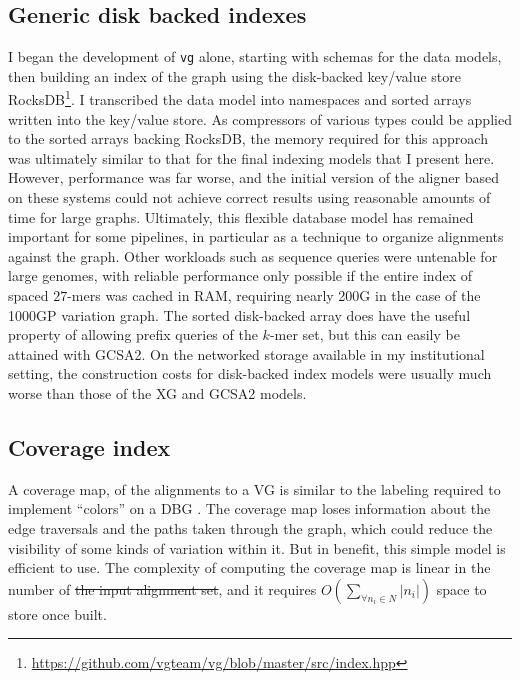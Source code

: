 \documentclass[a4paper,12pt,numbered,oneside]{Classes/PhDThesisPSnPDF}
\providecommand{\DIFaddtex}[1]{{\protect\color{blue}\uwave{#1}}} %
\providecommand{\DIFdeltex}[1]{{\protect\color{red}\sout{#1}}}                      %
\providecommand{\DIFaddbegin}{} %
\providecommand{\DIFaddend}{} %
\providecommand{\DIFdelbegin}{} %
\providecommand{\DIFdelend}{} %
\providecommand{\DIFadd}[1]{\texorpdfstring{\DIFaddtex{#1}}{#1}} %
\providecommand{\DIFdel}[1]{\texorpdfstring{\DIFdeltex{#1}}{}} %
\begin{document}
\subsection{Generic disk backed indexes}
\label{sec:generic_disk_backed_indexes}
I began the development of {\tt vg} alone, starting with schemas for the data models, then building an index of the graph using the disk-backed key/value store RocksDB\footnote{\url{https://github.com/vgteam/vg/blob/master/src/index.hpp}}.
I transcribed the data model into namespaces and sorted arrays written into the key/value store.
As compressors of various types could be applied to the sorted arrays backing RocksDB, the memory required for this approach was ultimately similar to that for the final indexing models that I present here.
However, performance was far worse, and the initial version of the aligner based on these systems could not achieve correct results using reasonable amounts of time for large graphs.
Ultimately, this flexible database model has remained important for some pipelines, in particular as a technique to organize alignments against the graph.
Other workloads such as sequence queries were untenable for large genomes, with reliable performance only possible if the entire index of spaced $27$-mers was cached in RAM, requiring nearly 200G in the case of the 1000GP variation graph.
The sorted disk-backed array does have the useful property of allowing prefix queries of the $k$-mer set, but this can easily be attained with GCSA2.
On the networked storage available in my institutional setting, the construction costs for disk-backed index models were usually much worse than those of the XG and GCSA2 models.

\subsection{Coverage index}
\label{sec:coverage_index}

A coverage map, of the alignments to a VG is similar to the labeling required to implement ``colors'' on a DBG \cite{iqbal2012}.
The coverage map loses information about the edge traversals and the paths taken through the graph, which could reduce the visibility of some kinds of variation within it.
But in benefit, this simple model is efficient to use.
The complexity of computing the coverage map is linear in the number of \DIFdelbegin \DIFdel{the input alignment set}\DIFdelend \DIFaddbegin \DIFadd{input alignments}\DIFaddend , and it requires $O(\sum_{\forall{n_i\in N}}|n_i|)$ space to store once built.
\end{document}
